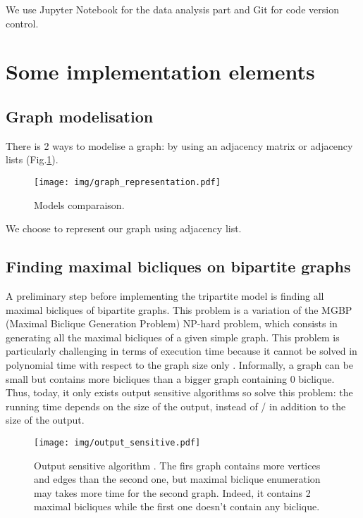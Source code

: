 \documentclass[table]{report}
\begin{document}
We use Jupyter Notebook for the data analysis part and Git for code version control.



\section{Some implementation elements}

\subsection{Graph modelisation}

There is 2 ways to modelise a graph: by using an adjacency matrix or adjacency lists (Fig.\ref{fig:graph_representation}).


\begin{figure}[h]%
\centering
\texttt{[image: img/graph\_representation.pdf]}
\caption{Models comparaison.}
\label{fig:graph_representation}
\end{figure}
\FloatBarrier

We choose to represent our graph using adjacency list. 

\subsection{Finding maximal bicliques on bipartite graphs}

A preliminary step before implementing the tripartite model is finding all maximal bicliques of bipartite graphs. This problem is a variation of the MGBP (Maximal Biclique Generation Problem) NP-hard problem, which consists in  generating all the maximal bicliques of a given simple graph. This problem is particularly challenging in terms of execution time because it cannot be solved in polynomial time with respect to the graph size only \cite{eppstein}.  Informally, a graph can be small but contains more bicliques than a bigger graph containing 0 biclique. Thus, today, it only exists output sensitive algorithms so solve this problem: the running time depends on the size of the output, instead of / in addition to the size of the output.



 
\begin{figure}[h]%
\centering
\texttt{[image: img/output\_sensitive.pdf]}
\caption{Output sensitive algorithm . The firs graph contains more vertices and edges than the second one, but maximal biclique enumeration may takes more time for the second graph. Indeed, it contains 2 maximal bicliques while the first one doesn't contain any biclique.}
\label{fig:output_sensitive}
\end{figure}
\FloatBarrier
\end{document}
